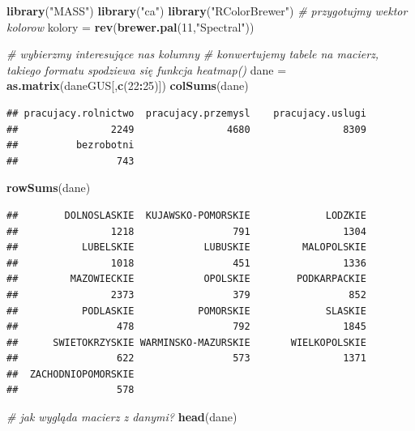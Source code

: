 \documentclass[polish,]{book}
\newenvironment{Shaded}{\begin{snugshade}}{\end{snugshade}}
\newcommand{\CommentTok}[1]{\textcolor[rgb]{0.56,0.35,0.01}{\textit{#1}}}
\newcommand{\DecValTok}[1]{\textcolor[rgb]{0.00,0.00,0.81}{#1}}
\newcommand{\KeywordTok}[1]{\textcolor[rgb]{0.13,0.29,0.53}{\textbf{#1}}}
\newcommand{\NormalTok}[1]{#1}
\newcommand{\OperatorTok}[1]{\textcolor[rgb]{0.81,0.36,0.00}{\textbf{#1}}}
\newcommand{\StringTok}[1]{\textcolor[rgb]{0.31,0.60,0.02}{#1}}
\begin{document}
\begin{Shaded}
\begin{Highlighting}[]
\KeywordTok{library}\NormalTok{(}\StringTok{"MASS"}\NormalTok{)}
\KeywordTok{library}\NormalTok{(}\StringTok{"ca"}\NormalTok{)}
\KeywordTok{library}\NormalTok{(}\StringTok{"RColorBrewer"}\NormalTok{)}
\CommentTok{# przygotujmy wektor kolorow}
\NormalTok{kolory =}\StringTok{ }\KeywordTok{rev}\NormalTok{(}\KeywordTok{brewer.pal}\NormalTok{(}\DecValTok{11}\NormalTok{,}\StringTok{"Spectral"}\NormalTok{))}

\CommentTok{# wybierzmy interesujące nas kolumny}
\CommentTok{# konwertujemy tabele na macierz, takiego formatu spodziewa się funkcja heatmap()}
\NormalTok{dane =}\StringTok{ }\KeywordTok{as.matrix}\NormalTok{(daneGUS[,}\KeywordTok{c}\NormalTok{(}\DecValTok{22}\OperatorTok{:}\DecValTok{25}\NormalTok{)])}
\KeywordTok{colSums}\NormalTok{(dane)}
\end{Highlighting}
\end{Shaded}

\begin{verbatim}
## pracujacy.rolnictwo  pracujacy.przemysl    pracujacy.uslugi 
##                2249                4680                8309 
##          bezrobotni 
##                 743
\end{verbatim}

\begin{Shaded}
\begin{Highlighting}[]
\KeywordTok{rowSums}\NormalTok{(dane)}
\end{Highlighting}
\end{Shaded}

\begin{verbatim}
##        DOLNOSLASKIE  KUJAWSKO-POMORSKIE             LODZKIE 
##                1218                 791                1304 
##           LUBELSKIE            LUBUSKIE         MALOPOLSKIE 
##                1018                 451                1336 
##         MAZOWIECKIE            OPOLSKIE        PODKARPACKIE 
##                2373                 379                 852 
##           PODLASKIE           POMORSKIE             SLASKIE 
##                 478                 792                1845 
##      SWIETOKRZYSKIE WARMINSKO-MAZURSKIE       WIELKOPOLSKIE 
##                 622                 573                1371 
##  ZACHODNIOPOMORSKIE 
##                 578
\end{verbatim}

\begin{Shaded}
\begin{Highlighting}[]
\CommentTok{# jak wygląda macierz z danymi?}
\KeywordTok{head}\NormalTok{(dane)}
\end{Highlighting}
\end{Shaded}
\end{document}
